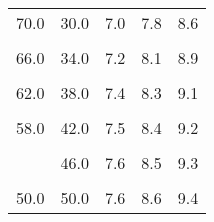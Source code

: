 \documentclass[
]{book}
\begin{document}
\begin{longtable}[t]{rrrrr}
70.0 & 30.0 & 7.0 & 7.8 & 8.6\\
\cellcolor{gray!6}{68.0} & \cellcolor{gray!6}{32.0} & \cellcolor{gray!6}{7.1} & \cellcolor{gray!6}{8.0} & \cellcolor{gray!6}{8.7}\\
66.0 & 34.0 & 7.2 & 8.1 & 8.9\\
\addlinespace
\cellcolor{gray!6}{64.0} & \cellcolor{gray!6}{36.0} & \cellcolor{gray!6}{7.3} & \cellcolor{gray!6}{8.2} & \cellcolor{gray!6}{9.0}\\
62.0 & 38.0 & 7.4 & 8.3 & 9.1\\
\cellcolor{gray!6}{60.0} & \cellcolor{gray!6}{40.0} & \cellcolor{gray!6}{7.5} & \cellcolor{gray!6}{8.4} & \cellcolor{gray!6}{9.2}\\
58.0 & 42.0 & 7.5 & 8.4 & 9.2\\
\cellcolor{gray!6}{56.0} & \cellcolor{gray!6}{44.0} & \cellcolor{gray!6}{7.6} & \cellcolor{gray!6}{8.5} & \cellcolor{gray!6}{9.3}\\
\addlinespace
54.0 & 46.0 & 7.6 & 8.5 & 9.3\\
\cellcolor{gray!6}{52.0} & \cellcolor{gray!6}{48.0} & \cellcolor{gray!6}{7.6} & \cellcolor{gray!6}{8.6} & \cellcolor{gray!6}{9.4}\\
50.0 & 50.0 & 7.6 & 8.6 & 9.4\\
\bottomrule
\end{longtable}
\end{document}

